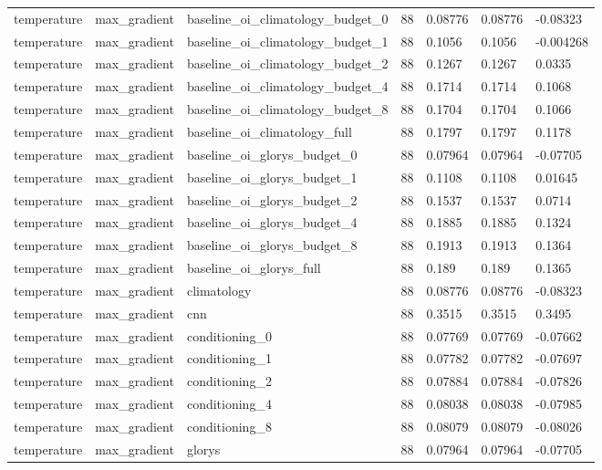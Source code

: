 \begin{table}[htbp]
\begin{tabular}{lllllll}
temperature & max\_gradient & baseline\_oi\_climatology\_budget\_0 & 88 & 0.08776 & 0.08776 & -0.08323 \\
temperature & max\_gradient & baseline\_oi\_climatology\_budget\_1 & 88 & 0.1056 & 0.1056 & -0.004268 \\
temperature & max\_gradient & baseline\_oi\_climatology\_budget\_2 & 88 & 0.1267 & 0.1267 & 0.0335 \\
temperature & max\_gradient & baseline\_oi\_climatology\_budget\_4 & 88 & 0.1714 & 0.1714 & 0.1068 \\
temperature & max\_gradient & baseline\_oi\_climatology\_budget\_8 & 88 & 0.1704 & 0.1704 & 0.1066 \\
temperature & max\_gradient & baseline\_oi\_climatology\_full & 88 & 0.1797 & 0.1797 & 0.1178 \\
temperature & max\_gradient & baseline\_oi\_glorys\_budget\_0 & 88 & 0.07964 & 0.07964 & -0.07705 \\
temperature & max\_gradient & baseline\_oi\_glorys\_budget\_1 & 88 & 0.1108 & 0.1108 & 0.01645 \\
temperature & max\_gradient & baseline\_oi\_glorys\_budget\_2 & 88 & 0.1537 & 0.1537 & 0.0714 \\
temperature & max\_gradient & baseline\_oi\_glorys\_budget\_4 & 88 & 0.1885 & 0.1885 & 0.1324 \\
temperature & max\_gradient & baseline\_oi\_glorys\_budget\_8 & 88 & 0.1913 & 0.1913 & 0.1364 \\
temperature & max\_gradient & baseline\_oi\_glorys\_full & 88 & 0.189 & 0.189 & 0.1365 \\
temperature & max\_gradient & climatology & 88 & 0.08776 & 0.08776 & -0.08323 \\
temperature & max\_gradient & cnn & 88 & 0.3515 & 0.3515 & 0.3495 \\
temperature & max\_gradient & conditioning\_0 & 88 & 0.07769 & 0.07769 & -0.07662 \\
temperature & max\_gradient & conditioning\_1 & 88 & 0.07782 & 0.07782 & -0.07697 \\
temperature & max\_gradient & conditioning\_2 & 88 & 0.07884 & 0.07884 & -0.07826 \\
temperature & max\_gradient & conditioning\_4 & 88 & 0.08038 & 0.08038 & -0.07985 \\
temperature & max\_gradient & conditioning\_8 & 88 & 0.08079 & 0.08079 & -0.08026 \\
temperature & max\_gradient & glorys & 88 & 0.07964 & 0.07964 & -0.07705 \\

\end{tabular}
\end{table}
